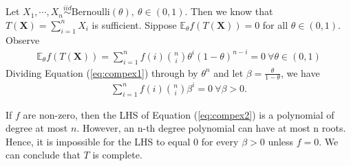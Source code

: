 \begin{example}
    Let $X_1,\cdots,X_n\overset{iid}{\sim}\text{Bernoulli}(\theta),~\theta\in(0,1)$.
    Then we know that $T(\boldsymbol{X})=\sum_{i=1}^n{X_i}$ is sufficient.
    Sippose $\mathbb{E}_\theta f(T(\boldsymbol{X}))=0$ for all $\theta\in(0,1)$. Observe
    \begin{gather}
        \mathbb{E}_\theta f(T(\boldsymbol{X}))
        =\sum_{i=1}^n{f(i)\binom{n}{i}\theta^i(1-\theta)^{n-i}}=0~\forall{\theta}\in(0,1)\label{eq:compex1}
    \end{gather}
    Dividing Equation (\ref{eq:compex1}) through by $\theta^n$ and let $\beta=\frac{\theta}{1-\theta}$, we have
    \begin{gather}
        \sum_{i=1}^n{f(i)\binom{n}{i}\beta^i}=0~\forall{\beta}>0.\label{eq:compex2}
    \end{gather}

    If $f$ are non-zero, then the LHS of Equation (\ref{eq:compex2}) is a polynomial of degree at most $n$.
    However, an n-th degree polynomial can have at most n roots. 
    Hence, it is impossible for the LHS to equal 0 for every $\beta>0$ unless $f=0$.
    We can conclude that $T$ is complete.
\end{example}

